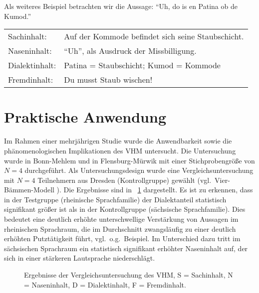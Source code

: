 \documentclass[11pt,DIV16,twocolumn]{scrartcl}
\begin{document}
%
Als weiteres Beispiel betrachten wir die Aussage: "`Uh, do is en
Patina ob de Kumod."'
%
\begin{center}
  \begin{tabularx}{\linewidth}{lX}
    Sachinhalt: & Auf der Kommode befindet sich seine Staubschicht. \\
    Naseninhalt: & "`Uh"', als Ausdruck der Missbilligung. \\
    Dialektinhalt: & Patina = Staubschicht; Kumod = Kommode \\
    Fremdinhalt: & Du musst Staub wischen!
  \end{tabularx}
\end{center}

\section{Praktische Anwendung}

Im Rahmen einer mehrjährigen Studie wurde die Anwendbarkeit sowie die
phänomenologischen Implikationen des VHM untersucht.  Die Untersuchung
wurde in Bonn-Mehlem und in Flensburg-Mürwik mit einer
Stichprobengröße von $N=4$ durchgeführt.  Als Untersuchungsdesign
wurde eine Vergleichsuntersuchung mit $N=4$ Teilnehmern aus Dresden
(Kontrollgruppe) gewählt (vgl.\ Vier-Bämmen-Modell \cite{VBM}).  Die
Ergebnisse sind in \figurename~\ref{fig:VHM} dargestellt.  Es ist zu
erkennen, dass in der Testgruppe (rheinische Sprachfamilie) der
Dialektanteil statistisch signifikant größer ist als in der
Kontrollgruppe (sächsische Sprachfamilie).  Dies bedeutet eine
deutlich erhöhte unterschwellige Verstärkung von Aussagen im
rheinischen Sprachraum, die im Durchschnitt zwangsläufig zu einer
deutlich erhöhten Putztätigkeit führt, vgl.\ o.g.\ Beispiel.  Im
Unterschied dazu tritt im sächsischen Sprachraum ein statistisch
signifikant erhöhter Naseninhalt auf, der sich in einer stärkeren
Lautsprache niederschlägt.

\begin{figure}[tb]
  \centering
  \caption{Ergebnisse der Vergleichsuntersuchung des VHM, S =
    Sachinhalt, N = Naseninhalt, D = Dialektinhalt, F = Fremdinhalt.}
  \label{fig:VHM}
\end{figure}
\end{document}

